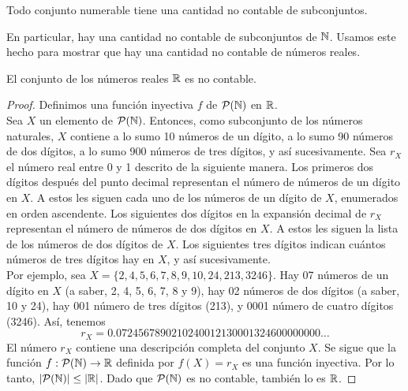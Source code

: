 \documentclass[12pt,a4paper]{book}
\begin{document}
    \begin{corolario}\label{cor:numerable-subconjuntos-no-contable}
        Todo conjunto numerable tiene una cantidad no contable de subconjuntos.
    \end{corolario}

    En particular, hay una cantidad no contable de subconjuntos de $\mathbb{N}$. Usamos este hecho para mostrar que hay una
    cantidad no contable de números reales.

    \begin{proposicion}\label{prop:R-no-contable}
        El conjunto de los números reales $\mathbb{R}$ es no contable.
    \end{proposicion}
    \begin{proof}
        Definimos una función inyectiva $f$ de $\mathcal{P}(\mathbb{N})$ en $\mathbb{R}$.\\
        Sea $X$ un elemento de $\mathcal{P}(\mathbb{N})$. Entonces, como subconjunto de los números naturales, $X$ contiene a lo sumo 10
        números de un dígito, a lo sumo 90 números de dos dígitos, a lo sumo 900 números de tres dígitos, y así
        sucesivamente. Sea $r_{X}$ el número real entre 0 y 1 descrito de la siguiente manera. Los primeros dos dígitos
        después del punto decimal representan el número de números de un dígito en $X$. A estos les siguen cada uno de los
        números de un dígito de $X$, enumerados en orden ascendente. Los siguientes dos dígitos en la expansión decimal de
        $r_{X}$ representan el número de números de dos dígitos en $X$. A estos les siguen la lista de los números de dos
        dígitos de $X$. Los siguientes tres dígitos indican cuántos números de tres dígitos hay en $X$, y así
        sucesivamente.\\
        Por ejemplo, sea $X=\{2,4,5,6,7,8,9,10,24,213,3246\}$. Hay 07 números de un dígito en $X$ (a saber, 2, 4, 5, 6, 7,
        8 y 9), hay 02 números de dos dígitos (a saber, 10 y 24), hay 001 número de tres dígitos (213), y 0001 número de
        cuatro dígitos (3246). Así, tenemos
        \begin{equation*}
            r_{X}=0.0724567890210240012130001324600000000\dots
        \end{equation*}
        El número $r_{X}$ contiene una descripción completa del conjunto $X$. Se sigue que la función
        $f:\mathcal{P}(\mathbb{N})\rightarrow\mathbb{R}$ definida por $f(X)=r_{X}$ es una función inyectiva. Por lo tanto, $|\mathcal{P}(\mathbb{N})|\leq|\mathbb{R}|$.
        Dado que $\mathcal{P}(\mathbb{N})$ es no contable, también lo es $\mathbb{R}$.
    \end{proof}
\end{document}
